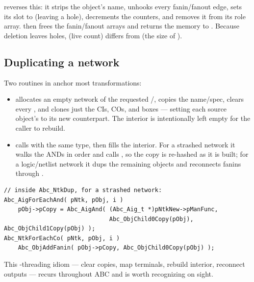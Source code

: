  reverses this: it strips the object's name, unhooks every
fanin/fanout edge, sets its  slot to  (leaving a hole),
decrements the counters, and removes it from its role array.
 then frees the fanin/fanout arrays and returns the memory to
. Because deletion leaves holes,  (live count)
differs from  (the size of ).

\subsection{Duplicating a network}

Two routines in  anchor most transformations:

\begin{itemize}
\item {} allocates an empty network of the requested
/, copies the name/spec, clears every , and clones
just the CIs, COs, and boxes --- setting each source object's  to its
new counterpart. The interior is intentionally left empty for the caller to
rebuild.
\item {} calls  with the same type, then
fills the interior. For a strashed network it walks the ANDs in order and calls
,
so the copy is re-hashed as it is built; for a logic/netlist network it dups the
remaining objects and reconnects fanins through .
\end{itemize}

\begin{lstlisting}[style=abccode]
// inside Abc_NtkDup, for a strashed network:
Abc_AigForEachAnd( pNtk, pObj, i )
    pObj->pCopy = Abc_AigAnd( (Abc_Aig_t *)pNtkNew->pManFunc,
                              Abc_ObjChild0Copy(pObj), Abc_ObjChild1Copy(pObj) );
Abc_NtkForEachCo( pNtk, pObj, i )
    Abc_ObjAddFanin( pObj->pCopy, Abc_ObjChild0Copy(pObj) );
\end{lstlisting}

This -threading idiom --- clear copies, map terminals, rebuild
interior, reconnect outputs --- recurs throughout ABC and is worth recognizing
on sight.
